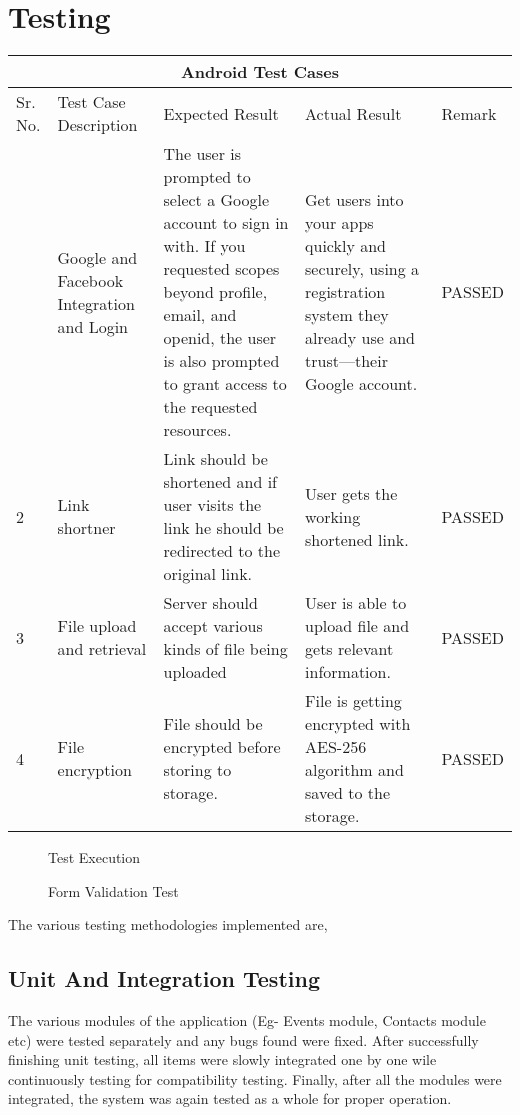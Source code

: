 \chapter{Testing}
\newpage


\begin{tabular}{ ||p{1cm}|p{3cm}|p{4cm}|p{4cm}|p{2cm}|| }
 \hline
 \multicolumn{5}{|c|}{Android Test Cases} \\
 \hline
Sr. No.& Test Case Description &Expected Result &Actual Result &Remark\\
\hline
 & Google and Facebook Integration and Login &	The user is prompted to select a Google account to sign in with. If you requested scopes beyond profile, email, and openid, the user is also prompted to grant access to the requested resources. &	Get users into your apps quickly and securely, using a registration system they already use and trust—their Google account. &	PASSED\\
 \hline
 2 & Link shortner  & Link should be shortened and if user visits the link he should be redirected to the original link.&	User gets the working shortened link.&	PASSED\\
 \hline
 3 &File upload and retrieval	& Server should accept various kinds of file being uploaded &	User is able to upload file and gets relevant information.&	PASSED\\
 \hline
 4 & File encryption &File should be encrypted before storing to storage. & File is getting encrypted with AES-256 algorithm and saved to the storage. &	PASSED\\
\hline
\end{tabular}

\newpage

\begin{figure}[h]
\begin{center}
    \caption{Test Execution}
    \label{1}
\end{center}
\end{figure}

\begin{figure}[h]
\begin{center}
    \caption{Form Validation Test}
    \label{1}
\end{center}
\end{figure}

\newpage
The various testing methodologies implemented are, 

\section{Unit And Integration Testing}
The various modules of the application (Eg- Events module, Contacts module etc) were tested separately and any bugs found were fixed. After successfully finishing unit testing, all items were slowly integrated one by one wile continuously testing for compatibility testing. Finally, after all the modules were integrated, the system was again tested as a whole for proper operation.

